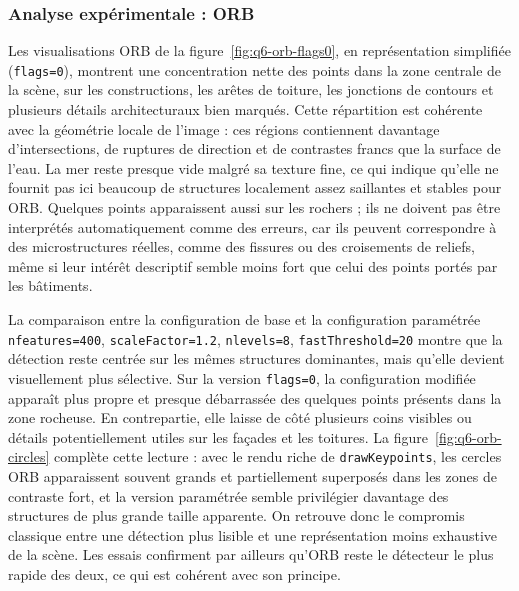 \documentclass[11pt,a4paper]{article}
\begin{document}
\subsubsection{Analyse expérimentale : ORB}
Les visualisations ORB de la figure~\ref{fig:q6-orb-flags0}, en représentation simplifiée (\texttt{flags=0}), montrent une concentration nette des points dans la zone centrale de la scène, sur les constructions, les arêtes de toiture, les jonctions de contours et plusieurs détails architecturaux bien marqués. Cette répartition est cohérente avec la géométrie locale de l'image : ces régions contiennent davantage d'intersections, de ruptures de direction et de contrastes francs que la surface de l'eau. La mer reste presque vide malgré sa texture fine, ce qui indique qu'elle ne fournit pas ici beaucoup de structures localement assez saillantes et stables pour ORB. Quelques points apparaissent aussi sur les rochers ; ils ne doivent pas être interprétés automatiquement comme des erreurs, car ils peuvent correspondre à des microstructures réelles, comme des fissures ou des croisements de reliefs, même si leur intérêt descriptif semble moins fort que celui des points portés par les bâtiments.

La comparaison entre la configuration de base et la configuration paramétrée \texttt{nfeatures=400}, \texttt{scaleFactor=1.2}, \texttt{nlevels=8}, \texttt{fastThreshold=20} montre que la détection reste centrée sur les mêmes structures dominantes, mais qu'elle devient visuellement plus sélective. Sur la version \texttt{flags=0}, la configuration modifiée apparaît plus propre et presque débarrassée des quelques points présents dans la zone rocheuse. En contrepartie, elle laisse de côté plusieurs coins visibles ou détails potentiellement utiles sur les façades et les toitures. La figure~\ref{fig:q6-orb-circles} complète cette lecture : avec le rendu riche de \texttt{drawKeypoints}, les cercles ORB apparaissent souvent grands et partiellement superposés dans les zones de contraste fort, et la version paramétrée semble privilégier davantage des structures de plus grande taille apparente. On retrouve donc le compromis classique entre une détection plus lisible et une représentation moins exhaustive de la scène. Les essais confirment par ailleurs qu'ORB reste le détecteur le plus rapide des deux, ce qui est cohérent avec son principe.
\end{document}
